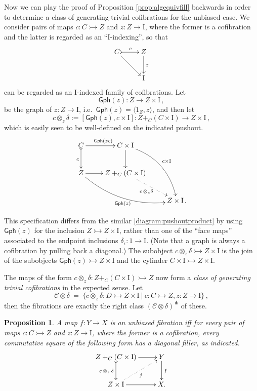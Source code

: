 \documentclass[11pt]{article}
\newcommand{\mono}{\ensuremath{\rightarrowtail}}
\newcommand{\I}{\ensuremath{\mathrm{I}}}
\newtheorem{proposition}[theorem]{Proposition}
\theoremstyle{remark}
\theoremstyle{definition}
\begin{document}
Now we can play the proof of Proposition \ref{prop:algequivfill} backwards in order to determine a class of generating trivial cofibrations for the unbiased case. We consider pairs of maps $c : C\mono Z$ and $z:Z\to\I$, where the former is a cofibration and the latter is regarded as an ``$\I$-indexing'', so that
\[
\xymatrix{
C \ar[rd] \ar@{>->}[r]^{c} & Z  \ar[d]^z \\
& \I
}
\]
can be regarded as an $\I$-indexed family of cofibrations.  Let 
\[
\mathsf{Gph}(z) : Z\to Z\times\I\,,
\]
be the graph of $z : Z\to \I$, i.e.\ $\mathsf{Gph}(z) = \langle 1_Z, z\rangle$, and then let
\[
c \otimes_z\!\delta := [\mathsf{Gph}(z), c\times\I] : Z+_C(C\times\I) \to Z\times \I\,,
\]
which is easily seen to be well-defined on the indicated pushout.
\begin{equation}\label{diagram:unbiasedpushoutproduct}
\xymatrix{
C \ar@{>->}[d]_{c} \ar[r]^{\mathsf{Gph}(zc)} & C\times \I \ar[d] \ar@/^4ex/ [rdd]^{c\times\I}\\
Z \ar@/_4ex/ [rrd]_{\mathsf{Gph}(z)} \ar[r] &  Z +_C (C\times\I) \ar@{.>}[rd]_{c\, \otimes_z \delta} \\
&& Z\times\I\,.
}
\end{equation}

This specification differs from the similar \eqref{diagram:pushoutproduct} by using $\mathsf{Gph}(z)$ for the inclusion $Z\mono Z\times\I$, rather than one of the ``face maps'' associated to the endpoint inclusions $\delta_\epsilon : 1\to\I$. (Note that a graph is always a cofibration by pulling back a diagonal.)  The subobject $c \otimes_z\!\delta \mono Z\times \I$ is the join of the subobjects $\mathsf{Gph}(z) \mono Z\times \I$ and the cylinder $C\times \I \mono Z\times \I$.

The maps of the form $c\otimes_z\delta : Z +_C (C\times\I) \mono Z$  now form a \emph{class of generating trivial cofibrations} in the expected sense.  Let 
\begin{equation}\label{eq:generatingtrivialcofibrations}
\mathcal{C}\otimes\delta\ =\ \{ c \otimes_z \delta : D \mono Z \times \I\ |\ c : C\mono Z, z:Z\to\I \}\,,
\end{equation}
then the fibrations are exactly the right class $(\mathcal{C}\otimes\delta)^{\pitchfork}$ of these.
\begin{proposition}
A map $f: Y\to X$ is an unbiased  fibration iff for every pair of maps $c : C\mono Z$ and $z:Z\to\I$, where the former is a cofibration, every commutative square of the following form has a diagonal filler, as indicated.
\begin{equation}\label{diagram:unbiasedfibration}
\xymatrix{
Z +_C (C\times\I) \ar@{>->}[d]_{c\, \otimes_z\, \delta} \ar[r] & Y \ar[d]^f \\
Z\times \I \ar@{.>}[ru]_{j} \ar[r] & X.
}
\end{equation}
\end{proposition}
\end{document}
